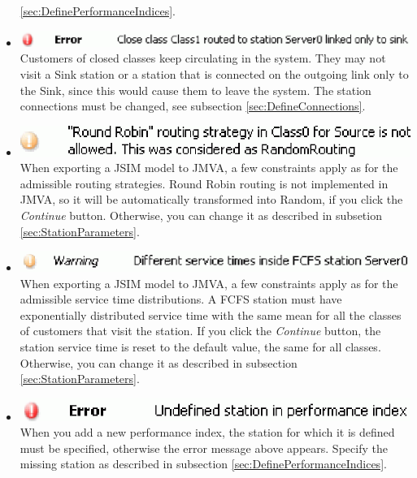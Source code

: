 \begin{description*}
\begin{itemize}
\autoref{sec:DefinePerformanceIndices}.
\item \includegraphics[scale=.5]{img/jsim/11.eps}\\
Customers of closed classes keep circulating in the system. They may not visit a Sink station or a station that is connected on the outgoing link only to the Sink, since this would cause them to leave the system. The station connections must be changed, see subsection \ref{sec:DefineConnections}.
\item \includegraphics[scale=.5]{img/jsim/12.eps}\\
When exporting a JSIM model to JMVA, a few constraints apply as for the admissible routing strategies. Round Robin routing is not implemented in JMVA, so it will be automatically transformed into Random, if you click the \emph{Continue} button. Otherwise, you can change it as described in subsetion \ref{sec:StationParameters}.
\item \includegraphics[scale=.5]{img/jsim/13.eps}\\
When exporting a JSIM model to JMVA, a few constraints apply as for the admissible service time distributions. A FCFS station must have exponentially distributed service time with the same mean for all the classes of customers that visit the station. If you click the \emph{Continue} button, the station service time is
reset to the default value, the same for all classes. Otherwise, you can change it as described in subsection \ref{sec:StationParameters}.
\item \includegraphics[scale=.5]{img/jsim/14.eps}\\
When you add a new performance index, the station for which it is defined must be specified, otherwise the error message above appears. Specify the missing station as described in subsection  \autoref{sec:DefinePerformanceIndices}.
\end{itemize}


\end{description*}
